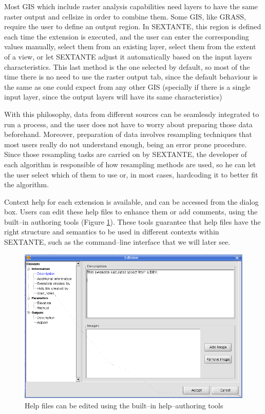 \documentclass[12pt,a4paper,twocolumn]{article}
\begin{document}
Most GIS which include raster analysis capabilities need layers to have the same raster output and cellsize in order to combine them. Some GIS, like GRASS, require the user to define an output region. In SEXTANTE, this region is defined each time the extension is executed, and the user can enter the corresponding values manually, select them from an existing layer, select them from the extent of a view, or let SEXTANTE adjust it  automatically based on the input layers characteristics. This last method is the one selected by default, so most of the time there is no need to use the raster output tab, since the default behaviour is the same as one could expect from any other GIS (specially if there is a single input layer, since the output layers will have its same characteristics)

With this philosophy, data from different sources can be seamlessly integrated to run a process, and the user does not have to worry about preparing those data beforehand. Moreover, preparation of data involves resampling techniques that most users really do not understand enough, being an error prone procedure. Since those resampling tasks are carried on by SEXTANTE, the developer of each algorithm is responsible of how resampling methods are used, so he can let the user select which of them to use or, in most cases, hardcoding it to better fit the algorithm.

Context help for each extension is available, and can be accessed from the dialog box. Users can edit these help files to enhance them or add comments, using the built--in authoring tools (Figure \ref{Fig:HelpAuthoring}). These tools guarantee that help files have the right structure and semantics to be used in different contexts within SEXTANTE, such as the command--line interface that we will later see.

\begin{figure}[!hbt] 
 \centering
 \includegraphics[width=.7\textwidth]{HelpAuthoring.png}
\caption{Help files can be edited using the built--in help--authoring tools}
\label{Fig:HelpAuthoring}
\end{figure}
\end{document}
